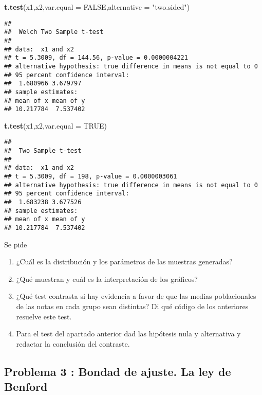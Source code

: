 \documentclass[
]{article}
\newenvironment{Shaded}{\begin{snugshade}}{\end{snugshade}}
\newcommand{\DataTypeTok}[1]{\textcolor[rgb]{0.13,0.29,0.53}{#1}}
\newcommand{\KeywordTok}[1]{\textcolor[rgb]{0.13,0.29,0.53}{\textbf{#1}}}
\newcommand{\NormalTok}[1]{#1}
\newcommand{\OtherTok}[1]{\textcolor[rgb]{0.56,0.35,0.01}{#1}}
\newcommand{\StringTok}[1]{\textcolor[rgb]{0.31,0.60,0.02}{#1}}
\providecommand{\tightlist}{%
  \setlength{\itemsep}{0pt}\setlength{\parskip}{0pt}}
\begin{document}
\begin{Shaded}
\begin{Highlighting}[]
\KeywordTok{t.test}\NormalTok{(x1,x2,}\DataTypeTok{var.equal =} \OtherTok{FALSE}\NormalTok{,}\DataTypeTok{alternative =} \StringTok{"two.sided"}\NormalTok{)}
\end{Highlighting}
\end{Shaded}

\begin{verbatim}
## 
##  Welch Two Sample t-test
## 
## data:  x1 and x2
## t = 5.3009, df = 144.56, p-value = 0.0000004221
## alternative hypothesis: true difference in means is not equal to 0
## 95 percent confidence interval:
##  1.680966 3.679797
## sample estimates:
## mean of x mean of y 
## 10.217784  7.537402
\end{verbatim}

\begin{Shaded}
\begin{Highlighting}[]
\KeywordTok{t.test}\NormalTok{(x1,x2,}\DataTypeTok{var.equal =} \OtherTok{TRUE}\NormalTok{)}
\end{Highlighting}
\end{Shaded}

\begin{verbatim}
## 
##  Two Sample t-test
## 
## data:  x1 and x2
## t = 5.3009, df = 198, p-value = 0.0000003061
## alternative hypothesis: true difference in means is not equal to 0
## 95 percent confidence interval:
##  1.683238 3.677526
## sample estimates:
## mean of x mean of y 
## 10.217784  7.537402
\end{verbatim}

Se pide

\begin{enumerate}
\def\labelenumi{\arabic{enumi}.}
\tightlist
\item
  ¿Cuál es la distribución y los parámetros de las muestras generadas?
\item
  ¿Qué muestran y cuál es la interpretación de los gráficos?
\item
  ¿Qué test contrasta si hay evidencia a favor de que las medias
  poblacionales de las notas en cada grupo sean distintas? Di qué código
  de los anteriores resuelve este test.
\item
  Para el test del apartado anterior dad las hipótesis nula y
  alternativa y redactar la conclusión del contraste.
\end{enumerate}

\hypertarget{problema-3-bondad-de-ajuste.-la-ley-de-benford}{%
\subsection{Problema 3 : Bondad de ajuste. La ley de
Benford}\label{problema-3-bondad-de-ajuste.-la-ley-de-benford}}
\end{document}
